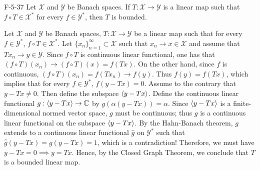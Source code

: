 \documentclass{article}
\begin{document}
	\begin{prb}{F-5-37}
		Let $\mathscr{X}$ and $\mathscr{Y}$ be Banach spaces. If $T: \mathscr{X} \to \mathscr{Y}$ is a linear map such that $f \circ T \in \mathscr{X}^{\ast}$ for every $f \in \mathscr{Y}^{\ast}$, then $T$ is bounded. 
	\end{prb}
	Let $\mathscr{X}$ and $\mathscr{Y}$ be Banach spaces, $T: \mathscr{X} \to \mathscr{Y}$ be a linear map such that for every $f \in \mathscr{Y}^{\ast}$, $f \circ T \in \mathscr{X}^{\ast}$. Let $\{x_{n}\}_{n = 1}^{\infty} \subset \mathscr{X}$ such that $x_{n} \to x \in \mathscr{X}$ and assume that $Tx_{n} \to y \in \mathscr{Y}$. Since $f \circ T$ is continuous linear functional, one has that $(f \circ T)(x_{n}) \to (f \circ T)(x) = f(Tx)$. On the other hand, since $f$ is continuous, $(f \circ T)(x_{n}) = f(Tx_{n}) \to f(y)$. Thus $f(y) = f(Tx)$, which implies that for every $f \in \mathscr{Y}^{\ast}$, $f(y - Tx) =0$. Assume to the contrary that $y - Tx \neq 0$. Then define the subspace $\braket{y - Tx}$. Define the continuous linear functional $g: \braket{y - Tx} \to \mathbb{C}$ by $g(\alpha(y - Tx)) = \alpha$. Since $\braket{y - Tx}$ is a finite-dimensional normed vector space, $g$ must be continuous; thus $g$ is a continuous linear functional on the subspace $\braket{y - Tx}$. By the Hahn-Banach theorem, $g$ extends to a continuous linear functional $\hat{g}$ on $\mathscr{Y}^{\ast}$ such that $\hat{g}(y - Tx) = g(y - Tx) = 1$, which is a contradiction! Therefore, we must have $y - Tx = 0 \implies y = Tx$. Hence, by the Closed Graph Theorem, we conclude that $T$ is a bounded linear map. 
	
\end{document}
